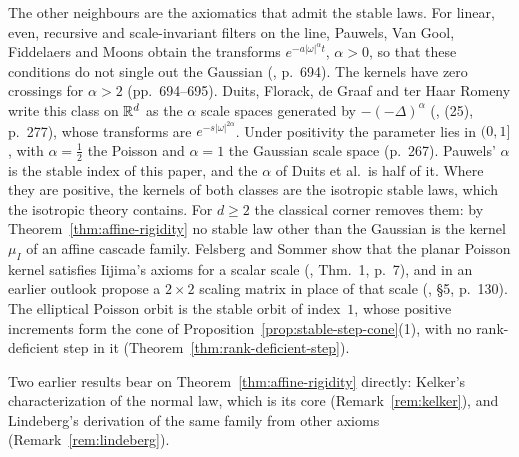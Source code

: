 The other neighbours are the axiomatics that admit the stable laws. For linear, even, recursive
and scale-invariant filters on the line, Pauwels, Van Gool, Fiddelaers and Moons obtain the
transforms $e^{-a|\omega|^\alpha t}$, $\alpha > 0$, so that these conditions do not single out the
Gaussian (, p.~694). The kernels have zero crossings for $\alpha > 2$
(pp.~694--695). Duits, Florack, de Graaf and ter Haar Romeny write this class on $\mathbb{R}^d$ as the
$\alpha$ scale spaces generated by $-(-\Delta)^\alpha$ (, (25), p.~277),
whose transforms are $e^{-s|\omega|^{2\alpha}}$. Under positivity the parameter lies in $(0, 1]$,
with $\alpha = \tfrac12$ the Poisson and $\alpha = 1$ the Gaussian scale space (p.~267). Pauwels'
$\alpha$ is the stable index of this paper, and the $\alpha$ of Duits et al.\ is half of it. Where they
are positive, the kernels of both classes are the isotropic stable laws, which the isotropic theory contains. For $d \ge 2$ the classical corner removes them: by Theorem~\ref{thm:affine-rigidity} no stable law other than the Gaussian is the
kernel $\mu_I$ of an affine cascade family. Felsberg and Sommer show that the planar Poisson kernel
satisfies Iijima's axioms for a scalar scale (, Thm.~1, p.~7), and in an
earlier outlook propose a $2 \times 2$ scaling matrix in place of that scale
(, \S5, p.~130). The elliptical Poisson orbit is the stable orbit of
index~$1$, whose positive increments form the cone of Proposition~\ref{prop:stable-step-cone}(1), with
no rank-deficient step in it (Theorem~\ref{thm:rank-deficient-step}).

Two earlier results bear on Theorem~\ref{thm:affine-rigidity} directly: Kelker's characterization of
the normal law, which is its core (Remark~\ref{rem:kelker}), and Lindeberg's derivation of the same
family from other axioms (Remark~\ref{rem:lindeberg}).

